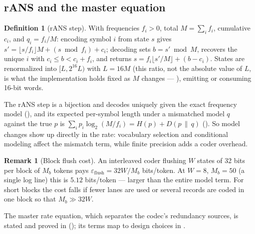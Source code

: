 \documentclass[10pt,twocolumn]{article}
\theoremstyle{plain}
\theoremstyle{definition}
\newtheorem{definition}[theorem]{Definition}
\newtheorem{remark}[theorem]{Remark}
\newcommand{\KL}[2]{D\!\left(#1 \,\|\, #2\right)}
\begin{document}
\subsection{rANS and the master equation}

\begin{definition}[rANS step]
With frequencies $f_i > 0$, total $M = \sum_i f_i$, cumulative $c_i$, and
$q_i = f_i/M$: encoding symbol $i$ from state $s$ gives
$s' = \lfloor s/f_i \rfloor M + (s \bmod f_i) + c_i$; decoding sets
$b = s' \bmod M$, recovers the unique $i$ with $c_i \le b < c_i + f_i$, and returns
$s = f_i\lfloor s'/M\rfloor + (b - c_i)$. States are renormalized into
$[L, 2^{16}L)$ with $L = 16M$ (this ratio, not the absolute value of $L$, is what the
implementation holds fixed as $M$ changes --- ), emitting or
consuming 16-bit words.
\end{definition}

The rANS step is a bijection and decodes uniquely given the exact frequency model
(), and its expected per-symbol length under a mismatched
model $q$ against the true $p$ is $\sum_i p_i \log_2(M/f_i) = H(p)+\KL{p}{q}$
(). So model changes show up directly in the rate: vocabulary
selection and conditional modeling affect the mismatch term, while finite precision
adds a coder overhead.

\begin{remark}[Block flush cost]\label{rem:flush}
An interleaved coder flushing $W$ states of 32 bits per block of $M_b$ tokens pays
$\varepsilon_{\mathrm{flush}} = 32W/M_b$ bits/token. At $W = 8$, $M_b = 50$ (a single
log line) this is $5.12$ bits/token --- larger than the entire model term. For short
blocks the cost falls if fewer lanes are used or several records are coded in one
block so that $M_b \gg 32W$.
\end{remark}

The master rate equation, which separates the codec's redundancy sources, is stated
and proved in  (); its terms map to design choices
in .
\end{document}
